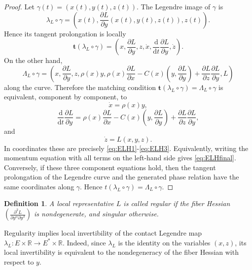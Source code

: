 \documentclass[10pt,a4paper]{amsart}
\newtheorem{definition}[theorem]{Definition}
\newcommand{\dd}{\mathrm{d}}
\begin{document}
\begin{proof}
Let \(\gamma(t)=(x(t),y(t),z(t))\). The Legendre image of \(\gamma\) is
\[
        \lambda_L\circ\gamma
        =
        \left(
        x(t),
        \frac{\partial L}{\partial y}(x(t),y(t),z(t)),
        z(t)
        \right).
\]
Hence its tangent prolongation is locally
\[
        \mathbf t(\lambda_L\circ\gamma)
        =
        \left(
        x,
        \frac{\partial L}{\partial y},
        z,
        \dot x,
        \frac{\dd}{\dd t}\frac{\partial L}{\partial y},
        \dot z
        \right).
\]
On the other hand,
\[
\Lambda_L\circ\gamma
=
\left(
 x,\frac{\partial L}{\partial y},z,
 \rho(x)y,
 \rho(x)\frac{\partial L}{\partial x}
 -
 C(x)\left(y,\frac{\partial L}{\partial y}\right)
 +
 \frac{\partial L}{\partial z}
 \frac{\partial L}{\partial y},
 L
\right)
\]
along the curve. Therefore the matching condition
$\mathbf t(\lambda_L\circ\gamma)
        =
        \Lambda_L\circ\gamma$ is equivalent, component by component, to
\[
        \dot x=\rho(x)y,
\]
\[
        \frac{\dd}{\dd t}
        \frac{\partial L}{\partial y}
        =
        \rho(x)\frac{\partial L}{\partial x}
        -
        C(x)\left(y,\frac{\partial L}{\partial y}\right)
        +
        \frac{\partial L}{\partial z}
        \frac{\partial L}{\partial y},
\]
and
\[
        \dot z=L(x,y,z).
\]
In coordinates these are precisely \eqref{eq:ELH1}-\eqref{eq:ELH3}.
Equivalently, writing the momentum equation with all terms on the left-hand side
gives \eqref{eq:ELHfinal}. Conversely, if these three component equations hold, then the tangent
prolongation of the Legendre curve and the generated phase relation have
the same coordinates along \(\gamma\). Hence
\(t(\lambda_L\circ\gamma)=\Lambda_L\circ\gamma\).
\end{proof}



\begin{definition}
A local representative \(L\) is called \emph{regular} if the fiber Hessian $\left(\frac{\partial^2L}{\partial y^\alpha\partial y^\beta}\right)$ is nondegenerate, and \emph{singular} otherwise.
\end{definition}




Regularity implies local invertibility of the contact Legendre map $\lambda_L:E\times\mathbb R\rightarrow E^*\times\mathbb R$. Indeed, since \(\lambda_L\) is the identity on the variables \((x,z)\), its local
invertibility is equivalent to the nondegeneracy of the fiber Hessian with respect
to \(y\).
\end{document}
